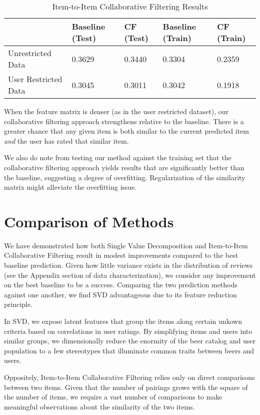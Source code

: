 \documentclass[12pt]{article}
\begin{document}
\begin{table}[ht!]
\centering
\caption{Item-to-Item Collaborative Filtering Results}
\label{my-label}
\begin{tabular}{lllll}
\hline
                        & Baseline (Test) & CF (Test) & Baseline (Train) & CF (Train) \\ \hline
Unrestricted Data     & 0.3629             & 0.3440                  & 0.3304              & 0.2359                   \\
User Restricted Data  & 0.3045             & 0.3011                  & 0.3042              & 0.1918                   \\ \hline
\end{tabular}
\end{table}

When the feature matrix is denser (as in the user restricted dataset), our collaborative filtering approach strengthens relative to the baseline. There is a greater chance that any given item is both similar to the current predicted item \textit{and} the user has rated that similar item.

We also do note from testing our method against the training set that the collaborative filtering approach yields results that are significantly better than the baseline, suggesting a degree of overfitting. Regularization of the similarity matrix might alleviate the overfitting issue.

\section{Comparison of Methods}
We have demonstrated how both Single Value Decomposition and Item-to-Item Collaborative Filtering result in modest improvements compared to the best baseline prediction. Given how little variance exists in the distribution of reviews (see the Appendix section of data characterization), we consider any improvement on the best baseline to be a success. Comparing the two prediction methods against one another, we find SVD advantageous due to its feature reduction principle.

In SVD, we expose latent features that group the items along certain unkown criteria based on correlations in user ratings. By simplifying items and users into similar groups, we dimensionally reduce the enormity of the beer catalog and user population to a few stereotypes that illuminate common traits between beers and users.

Oppositely, Item-to-Item Collaborative Filtering relies only on direct comparisons between two items. Given that the number of pairings grows with the square of the number of items, we require a vast number of comparisons to make meaningful observations about the similarity of the two items.
\end{document}
